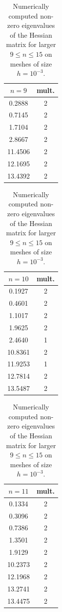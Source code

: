 \documentclass[11pt]{article}
\newcommand{\smaller}{\small}
\numberwithin{equation}{section}\newtheorem*{jepEnonce}{\jepEnonceTitle}\newenvironment{enonce*}[1]{\def\jepEnonceTitle{#1}\jepEnonce}{\endjepEnonce}\newtheorem*{conj*}{Conjecture}
\theoremstyle{plain}
\theoremstyle{definition}
\begin{document}
\begin{table}
\smaller
\caption{Numerically computed non-zero eigenvalues of the Hessian matrix for larger $9\leq n \leq 15$ on meshes of size $h=10^{-3}$.}
\label{tab:eig-numeric}
\centering
\raisebox{25pt}
{\begin{minipage}{.2\textwidth}
\begin{tabular}{|c|c|}
\hline
$n = 9$ & mult.\\ \hline
0.2888 & 2\\
0.7145 & 2\\
1.7104 & 2\\
2.8667 & 2\\
11.4506 & 2\\
12.1695 & 2\\
13.4392 & 2\\
\hline
\end{tabular}
\end{minipage}}
\raisebox{12.5pt}
{\begin{minipage}{.2\textwidth}
\begin{tabular}{|c|c|}
\hline
$n = 10$ & mult.\\ \hline
0.1927 & 2\\
0.4601 & 2\\
1.1017 & 2\\
1.9625 & 2\\
2.4640 & 1\\
10.8361 & 2\\
11.9253 & 1\\
12.7814 & 2\\
13.5487 & 2\\
\hline
\end{tabular}
\end{minipage}}
\raisebox{12.5pt}
{\begin{minipage}{.2\textwidth}
\begin{tabular}{|c|c|}
\hline
$n = 11$ & mult.\\ \hline
0.1334 & 2\\
0.3096& 2\\
0.7386& 2\\
1.3501& 2\\
1.9129& 2\\
10.2373& 2\\
12.1968& 2\\
13.2741& 2\\
13.4475& 2\\
\hline
\end{tabular}
\end{minipage}}
\begin{minipage}{.2\textwidth}

\end{minipage}
\end{table}
\end{document}
